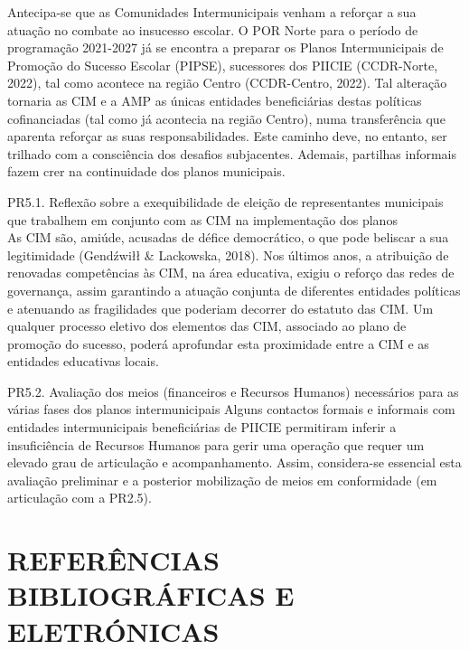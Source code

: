 \documentclass[
]{book}
\begin{document}
Antecipa-se que as Comunidades Intermunicipais venham a reforçar a sua atuação no combate ao insucesso escolar. O POR Norte para o período de programação 2021-2027 já se encontra a preparar os Planos Intermunicipais de Promoção do Sucesso Escolar (PIPSE), sucessores dos PIICIE (CCDR-Norte, 2022), tal como acontece na região Centro (CCDR-Centro, 2022). Tal alteração tornaria as CIM e a AMP as únicas entidades beneficiárias destas políticas cofinanciadas (tal como já acontecia na região Centro), numa transferência que aparenta reforçar as suas responsabilidades. Este caminho deve, no entanto, ser trilhado com a consciência dos desafios subjacentes. Ademais, partilhas informais fazem crer na continuidade dos planos municipais.

PR5.1. Reflexão sobre a exequibilidade de eleição de representantes municipais que trabalhem em conjunto com as CIM na implementação dos planos\\
As CIM são, amiúde, acusadas de défice democrático, o que pode beliscar a sua legitimidade (Gendźwiłł \& Lackowska, 2018). Nos últimos anos, a atribuição de renovadas competências às CIM, na área educativa, exigiu o reforço das redes de governança, assim garantindo a atuação conjunta de diferentes entidades políticas e atenuando as fragilidades que poderiam decorrer do estatuto das CIM. Um qualquer processo eletivo dos elementos das CIM, associado ao plano de promoção do sucesso, poderá aprofundar esta proximidade entre a CIM e as entidades educativas locais.

PR5.2. Avaliação dos meios (financeiros e Recursos Humanos) necessários para as várias fases dos planos intermunicipais
Alguns contactos formais e informais com entidades intermunicipais beneficiárias de PIICIE permitiram inferir a insuficiência de Recursos Humanos para gerir uma operação que requer um elevado grau de articulação e acompanhamento. Assim, considera-se essencial esta avaliação preliminar e a posterior mobilização de meios em conformidade (em articulação com a PR2.5).

\hypertarget{referuxeancias-bibliogruxe1ficas-e-eletruxf3nicas}{%
\chapter*{\texorpdfstring{\textbf{REFERÊNCIAS BIBLIOGRÁFICAS E ELETRÓNICAS}}{REFERÊNCIAS BIBLIOGRÁFICAS E ELETRÓNICAS}}\label{referuxeancias-bibliogruxe1ficas-e-eletruxf3nicas}}
\end{document}
